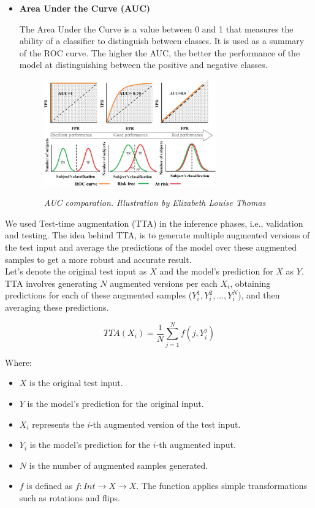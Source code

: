 \begin{itemize}
  \item {\bf Area Under the Curve (AUC)}

  The Area Under the Curve is a value between 0 and 1 that measures the
  ability of a classifier to distinguish between classes. It is used as a summary of
  the ROC curve. The higher the AUC, the better the performance of the model at
  distinguishing between the positive and negative classes.

  \begin{figure}[H]
    \centering
    \includegraphics[width=0.7\textwidth]{imatges/validation-strategy/auc.png}
    \caption[AUC-ROC performance]{\textit{AUC comparation. Illustration by Elizabeth Louise Thomas}}
    {\label{fig:auc-roc}}
  \end{figure}

\end{itemize}

We used Test-time augmentation (TTA) in the inference phases, i.e., validation
and testing. The idea behind TTA, is to generate multiple augmented versions of
the test input and average the predictions of the model over these augmented
samples to get a more robust and accurate result. \\

Let's denote the original test input as \(X\) and the model's prediction for
\(X\) as \(Y\). TTA involves generating \(N\) augmented versions per each
\(X_i\), obtaining predictions for each of these augmented samples (\(Y_i^1, Y_i^2,
..., Y_i^N\)), and then averaging these predictions.

\[ TTA(X_i) = \frac{1}{N} \sum_{j=1}^{N} f(j, Y_i^j) \]

Where:

\begin{itemize}
  \item \(X\) is the original test input.
  \item \(Y\) is the model's prediction for the original input.
  \item \(X_i\) represents the \(i\)-th augmented version of the test input.
  \item \(Y_i\) is the model's prediction for the \(i\)-th augmented input.
  \item \(N\) is the number of augmented samples generated.
  \item \(f\) is defined as \(f: Int \rightarrow X \rightarrow X\). The
    function applies simple transformations such as rotations and flips.
\end{itemize}


